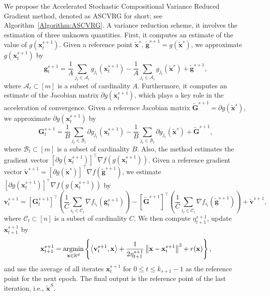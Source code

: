 \documentclass[11pt]{article}
\newcommand{\x}{\mathbf x}
\newcommand{\sv}{\mathbf v}
\newcommand{\g}{\mathbf g}
\newcommand{\G}{\mathbf G}
\newcommand{\argmin}{\mathop{\rm argmin}}
\newcommand{\CCal}{\mathcal{C}}
\newcommand{\br}{\mathbb{R}}
\newcommand{\ACal}{\mathcal{A}}
\newcommand{\BCal}{\mathcal{B}}
\begin{document}
We propose the Accelerated Stochastic Compositional Variance Reduced Gradient method, denoted as ASCVRG for short; see Algorithm~\ref{Algorithm:ASCVRG}. A variance reduction scheme, it involves the estimation of three unknown quantities. First, it computes an estimate of the value of $g(\x_t^{s+1})$. Given a reference point $\tilde{\x}^s$, $\tilde{\g}^{s+1} = g(\tilde{\x}^s)$, we approximate $g(\x_t^{s+1})$ by
\begin{equation}\label{Update:ASCVRG-Inner}
\g_t^{s+1} = \frac{1}{A}\sum_{j_t\in\ACal_t} g_{j_t}(\x_t^{s+1}) - \frac{1}{A}\sum_{j_t\in\ACal_t} g_{j_t}(\tilde{\x}^s) + \tilde{\g}^{s+1},  
\end{equation}
where $\ACal_t\subset\left[m\right]$ is a subset of cardinality $A$. Furthermore, it computes an estimate of the Jacobian matrix $\partial g(\x_t^{s+1})$, which plays a key role in the acceleration of convergence. Given a reference Jacobian matrix $\tilde{\G}^{s+1}=\partial g(\tilde{\x}^s)$, we approximate $\partial g(\x_t^{s+1})$ by
\begin{equation}\label{Update:ASCVRG-Jacobian}
\G_t^{s+1} = \frac{1}{B}\sum_{j_t\in\BCal_t} \partial g_{j_t}(\x_t^{s+1}) - \frac{1}{B}\sum_{j_t\in\BCal_t} \partial g_{j_t}(\tilde{\x}^s) + \tilde{\G}^{s+1}, 
\end{equation}
where $\BCal_t\subset\left[m\right]$ is a subset of cardinality $B$. Also, the method estimates the gradient vector $\left[\partial g(\x_t^{s+1})\right]^\top\nabla f(g(\x_t^{s+1}))$. Given a reference gradient vector $\tilde{\sv}^{s+1}=\left[\partial g(\tilde{\x}^s)\right]^\top\nabla f(\tilde{\g}^{s+1})$, we estimate $\left[\partial g(\x_t^{s+1})\right]^\top\nabla f(g(\x_t^{s+1}))$ by
\begin{equation}\label{Update:ASCVRG-Outer}
\sv_t^{s+1} = \left[\G_t^{s+1}\right]^\top\left(\frac{1}{C}\sum_{i_t\in\CCal_t} \nabla f_{i_t}(\g_t^{s+1})\right) - \left[\tilde{\G}^{s+1}\right]^\top\left(\frac{1}{C}\sum_{i_t\in\CCal_t}\nabla f_{i_t}(\tilde{\g}^{s+1})\right) + \tilde{\sv}^{s+1}, 
\end{equation} 
where $\CCal_t\subset\left[n\right]$ is a subset of cardinality $C$. We then compute $\eta_{t+1}^{s+1}$, update $\x_{t+1}^{s+1}$ by
\begin{equation}\label{Update:ASCVRG-Main}
\x_{t+1}^{s+1} = \argmin_{\x\in\br^d}\left\{ \left\langle \sv_t^{s+1}, \x\right\rangle + \frac{1}{2\eta_{t+1}^{s+1}}\left\| \x - \x_t^{s+1}\right\|^2 + r(\x)\right\}, 
\end{equation}
and use the average of all iterates $\x_t^{s+1}$ for $0 \leq t \leq k_{s+1}-1$ as the reference point for the next epoch. The final output is the reference point of the last iteration, i.e., $\tilde{\x}^S$.  
\end{document}
